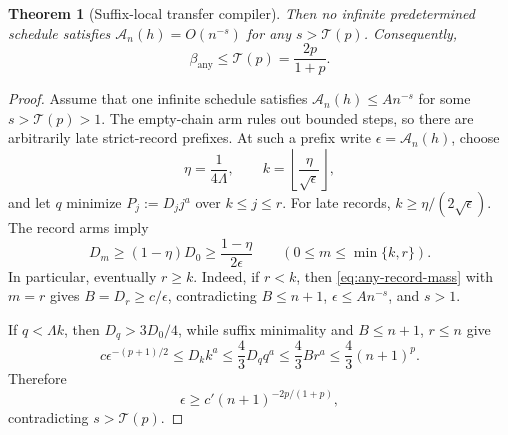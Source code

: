 \documentclass[11pt]{article}
\newtheorem{theorem}{Theorem}[section]
\theoremstyle{definition}
\theoremstyle{remark}
\newcommand{\anyexp}{\beta_{\mathrm{any}}}
\newcommand{\anyrisk}{\mathcal A}
\newcommand{\Transfer}{\mathcal T}
\begin{document}
\begin{theorem}[Suffix-local transfer compiler]
Then no infinite predetermined schedule satisfies
\(\anyrisk_n(h)=O(n^{-s})\) for any \(s>\Transfer(p)\).  Consequently,
\begin{equation}
 \boxed{\anyexp\le\Transfer(p)=\frac{2p}{1+p}.}
 \label{eq:any-transfer}
\end{equation}
\end{theorem}

\begin{proof}
Assume that one infinite schedule satisfies
\(\anyrisk_n(h)\le A n^{-s}\) for some \(s>\Transfer(p)>1\).  The
empty-chain arm rules out bounded steps, so there are arbitrarily late
strict-record prefixes.  At such a prefix write
\(\epsilon=\anyrisk_n(h)\), choose
\[
 \eta=\frac1{4\Lambda},
 \qquad
 k=\left\lfloor\frac{\eta}{\sqrt\epsilon}\right\rfloor,
\]
and let \(q\) minimize \(P_j:=D_jj^a\) over \(k\le j\le r\).
For late records, \(k\ge\eta/(2\sqrt\epsilon)\).  The record arms imply
\begin{equation}
 D_m\ge(1-\eta)D_0\ge\frac{1-\eta}{2\epsilon}
 \qquad(0\le m\le\min\{k,r\}).
 \label{eq:any-record-mass}
\end{equation}
In particular, eventually \(r\ge k\).  Indeed, if \(r<k\), then
\eqref{eq:any-record-mass} with \(m=r\) gives
\(B=D_r\ge c/\epsilon\), contradicting \(B\le n+1\),
\(\epsilon\le An^{-s}\), and \(s>1\).

If \(q<\Lambda k\), then \(D_q>3D_0/4\), while suffix minimality and
\(B\le n+1\), \(r\le n\) give
\[
 c\epsilon^{-(p+1)/2}
 \le D_kk^a
 \le\frac43D_qq^a
 \le\frac43Br^a
 \le\frac43(n+1)^p.
\]
Therefore
\[
 \epsilon\ge c'(n+1)^{-2p/(1+p)},
\]
contradicting \(s>\Transfer(p)\).


\end{proof}
\end{document}
